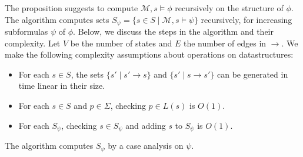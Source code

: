 \documentclass[10pt,a4paper]{article}
\theoremstyle{definition}
\begin{document}
The proposition suggests to compute $\mathcal{M}, s \models \phi$ recursively on the structure of $\phi$. The algorithm computes sets $S_\psi = \{s \in S \mid \mathcal{M}, s \models \psi\}$ recursively, for increasing subformulas $\psi$ of $\phi$. Below, we discuss the steps in the algorithm and their complexity. Let $V$ be the number of states and $E$ the number of edges in $\rightarrow$. We make the following complexity assumptions about operations on datastructures:

\begin{itemize}
	\item For each $s \in S$, the sets $\{s' \mid s' \rightarrow s\}$ and $\{s' \mid s \rightarrow s'\}$ can be generated in time linear in their size.
	\item For each $s \in S$ and $p\in\Sigma$, checking $p\in L(s)$ is $O(1)$.
	\item For each $S_\psi$, checking $s \in S_\psi$ and adding $s$ to $S_\psi$ is $O(1)$.
\end{itemize}

The algorithm computes $S_\psi$ by a case analysis on $\psi$.
\end{document}
